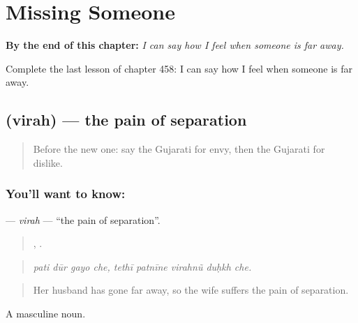 
\chapter{Missing Someone}
\label{ch:gu-missing-someone}

\begin{chapteropening}
\textbf{By the end of this chapter:} \emph{I can say how I feel when someone is far away.}

Complete the last lesson of chapter 458: I can say how I feel when someone is far away.
\end{chapteropening}

\section[\texorpdfstring{\gu{વિરહ} (virah)}{વિરહ (virah)}]{ (virah) — the pain of separation}

\label{lesson:GU-C458-virah}



\begin{quote}
Before the new one: say the Gujarati for envy, then the Gujarati for dislike.
\end{quote}

\subsection*{You'll want to know: }
\textbf{} — \emph{virah} — \textquotedblleft{}the pain of separation\textquotedblright{}.

\begin{quote}
   ,     .
\end{quote}

\begin{quote}
\emph{pati dūr gayo che, tethī patnīne virahnũ duḥkh che.}
\end{quote}

\begin{quote}
Her husband has gone far away, so the wife suffers the pain of separation.
\end{quote}

A masculine noun.

